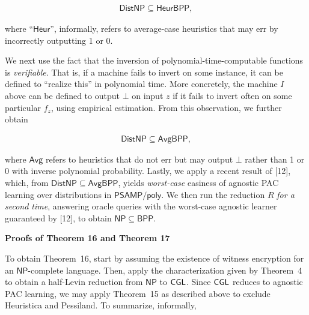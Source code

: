 \[\begin{gathered}
{\mathsf{Dist}}{\mathsf{NP}}\subseteq{\mathsf{Heur}}{\mathsf{BPP}},
\end{gathered}\]


where “${\mathsf{Heur}}$”, informally, refers to average-case heuristics that may err by incorrectly outputting 1 or 0.\par




We next use the fact that the inversion of polynomial-time-computable functions is \emph{verifiable}. That is, if a machine fails to invert on some instance, it can be defined to “realize this” in polynomial time. More concretely, the machine $I$ above can be defined to output $\bot$ on input $z$ if it fails to invert often on some particular $f_{z}$, using empirical estimation. From this observation, we further obtain\par


\[\begin{gathered}
{\mathsf{Dist}}{\mathsf{NP}}\subseteq{\mathsf{Avg}}{\mathsf{BPP}},
\end{gathered}\]


where ${\mathsf{Avg}}$ refers to heuristics that do not err but may output $\bot$ rather than 1 or 0 with inverse polynomial probability. Lastly, we apply a recent result of [12], which, from ${\mathsf{Dist}}{\mathsf{NP}}\subseteq{\mathsf{Avg}}{\mathsf{BPP}}$, yields \emph{worst-case} easiness of agnostic PAC learning over distributions in ${\mathsf{P}}{\mathsf{SAMP}}/{\mathsf{poly}}$. We then run the reduction $R$ \emph{for a second time}, answering oracle queries with the worst-case agnostic learner guaranteed by [12], to obtain ${\mathsf{NP}}\subseteq{\mathsf{BPP}}$.\par





\par\medskip\noindent\textbf{Proofs of Theorem 16 and Theorem 17
}\par




To obtain Theorem 16, start by assuming the existence of witness encryption for an ${\mathsf{NP}}$-complete language. Then, apply the characterization given by Theorem 4 to obtain a half-Levin reduction from ${\mathsf{NP}}$ to ${\sf CGL}$. Since ${\sf CGL}$ reduces to agnostic PAC learning, we may apply Theorem 15 as described above to exclude Heuristica and Pessiland. To summarize, informally,\par


